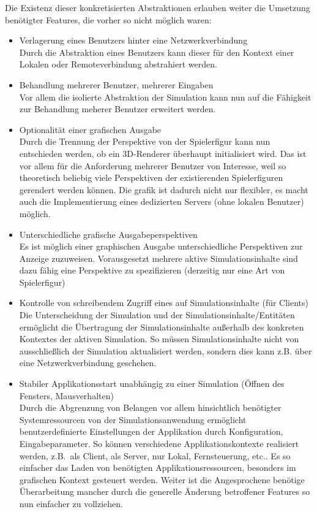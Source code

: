 \documentclass[11pt,twoside,a4paper]{article}
\begin{document}
Die Existenz dieser konkretisierten Abstraktionen erlauben weiter die Umsetzung benötigter Features, die vorher so nicht möglich waren:
\begin{itemize}
\item Verlagerung eines Benutzers hinter eine Netzwerkverbindung\\
	Durch die Abstraktion eines Benutzers kann dieser für den Kontext einer Lokalen oder Remoteverbindung abstrahiert werden.
\item Behandlung mehrerer Benutzer, mehrerer Eingaben\\
	Vor allem die isolierte Abstraktion der Simulation kann nun auf die Fähigkeit zur Behandlung meherer Benutzer erweitert werden.
\item Optionalität einer grafischen Ausgabe\\
	Durch die Trennung der Perspektive von der Spielerfigur kann nun entschieden werden, ob ein 3D-Renderer überhaupt initialisiert wird. Das ist vor allem für die Anforderung mehrerer Benutzer von Interesse, weil so theoretisch beliebig viele Perspektiven der existierenden Spielerfiguren gerendert werden können. Die grafik ist dadurch nicht nur flexibler, es macht auch die Implementierung eines dedizierten Servers (ohne lokalen Benutzer) möglich.
\item Unterschiedliche grafische Ausgabeperspektiven\\
	Es ist möglich einer graphischen Ausgabe unterschiedliche Perspektiven zur Anzeige zuzuweisen. Vorausgesetzt mehrere aktive Simulationsinhalte sind dazu fähig eine Perspektive zu spezifizieren (derzeitig nur eine Art von Spielerfigur)
\item Kontrolle von schreibendem Zugriff eines auf Simulationsinhalte (für Clients)\\
Die Unterscheidung der Simulation und der Simulationsinhalte/Entitäten ermöglicht die Übertragung der Simulationsinhalte außerhalb des konkreten Kontextes der aktiven Simulation. So müssen Simulationsinhalte nicht von ausschließlich der Simulation aktualisiert werden, sondern dies kann z.B. über eine Netzwerkverbindung geschehen.
\item Stabiler Applikationsstart unabhängig zu einer Simulation (Öffnen des Fensters, Mausverhalten)\\
	Durch die Abgrenzung von Belangen vor allem hinsichtlich benötigter Systemressourcen von der Simulationsanwendung ermöglicht benutzerdefinierte Einstellungen der Applikation durch Konfiguration, Eingabeparameter.
	So können verschiedene Applikationskontexte realisiert werden, z.B.~als Client, als Server, nur Lokal, Fernsteuerung, etc..
	Es so einfacher das Laden von benötigten Applikationsressourcen, besonders im grafischen Kontext gesteuert werden.
	Weiter ist die Angesprochene benötige Überarbeitung mancher durch die generelle Änderung betroffener Features so nun einfacher zu vollziehen.
\end{itemize}
\end{document}
